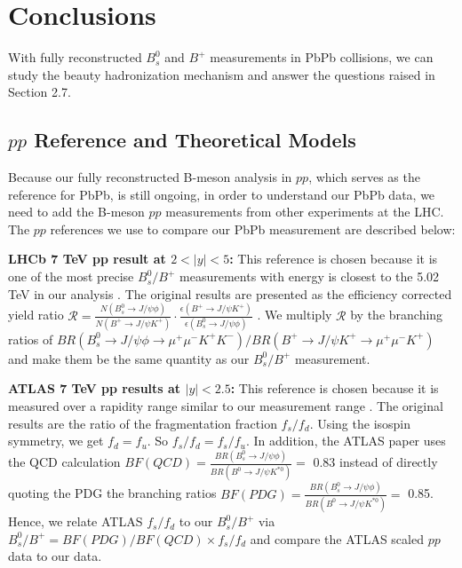 \chapter{Conclusions}

With fully reconstructed $B^0_s$ and $B^+$ measurements in PbPb collisions, we can study the beauty hadronization mechanism and answer the questions raised in Section 2.7.

\section{$pp$ Reference and Theoretical Models}

Because our fully reconstructed B-meson analysis in $pp$, which serves as the reference for PbPb, is still ongoing, in order to understand our PbPb data, we need to add the B-meson $pp$ measurements from other experiments at the LHC. The $pp$ references we use to compare our PbPb measurement are described below:

\textbf{LHCb 7 TeV pp result at $2 < |y| < 5$:} This reference is chosen because it is one of the most precise $B^0_s/B^+$ measurements with energy is closest to the 5.02 TeV in our analysis \cite{LHCbFF}. The original results are presented as the efficiency corrected yield ratio $\mathcal{R} = \frac{N(B^0_s \rightarrow J/\psi \phi)}{N(B^+ \rightarrow J/\psi K^+)} \cdot \frac{\epsilon(B^+ \rightarrow J/\psi K^+)}{\epsilon(B^0_s \rightarrow J/\psi \phi)}$ \cite{LHCbFF}. We multiply $\mathcal{R}$ by the branching ratios of $BR(B^0_s \rightarrow J/\psi \phi \rightarrow \mu^+\mu^- K^+ K^-)/BR(B^+ \rightarrow J/\psi K^+ \rightarrow \mu^+\mu^- K^+)$ and make them be the same quantity as our $B^0_s/B^+$ measurement.

\textbf{ATLAS 7 TeV pp results at $|y| < 2.5$:} This reference is chosen because it is measured over a rapidity range similar to our measurement range \cite{ATLASPPRef}. The original results are the ratio of the fragmentation fraction $f_s/f_d$. Using the isospin symmetry, we get $f_d = f_u$. So $f_s/f_d = f_s/f_u$. In addition, the ATLAS paper uses the QCD calculation $BF(QCD) = \frac{BR(B^0_s \rightarrow J/\psi \phi)}{BR(B^0 \rightarrow J/\psi K^{*0})} =$ 0.83 instead of directly quoting the PDG the branching ratios $BF(PDG) = \frac{BR(B^0_s \rightarrow J/\psi \phi)}{BR(B^0 \rightarrow J/\psi K^{*0})} =$ 0.85. Hence, we relate ATLAS $f_s/f_d$ to our $B^0_s/B^+$ via $B^0_s/B^+ = BF(PDG)/BF(QCD) \times f_s/f_d$ and compare the ATLAS scaled $pp$ data to our data.


